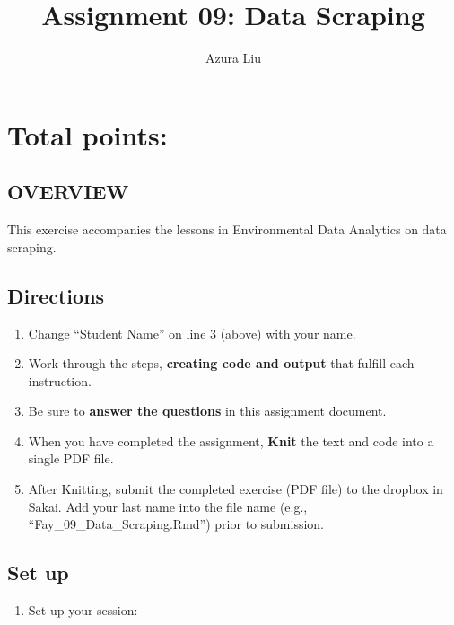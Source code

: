 \documentclass[
]{article}
\title{Assignment 09: Data Scraping}
\author{Azura Liu}
\date{}
\providecommand{\tightlist}{%
  \setlength{\itemsep}{0pt}\setlength{\parskip}{0pt}}
\begin{document}
\maketitle

\hypertarget{total-points}{%
\section{Total points:}\label{total-points}}

\hypertarget{overview}{%
\subsection{OVERVIEW}\label{overview}}

This exercise accompanies the lessons in Environmental Data Analytics on
data scraping.

\hypertarget{directions}{%
\subsection{Directions}\label{directions}}

\begin{enumerate}
\def\labelenumi{\arabic{enumi}.}
\tightlist
\item
  Change ``Student Name'' on line 3 (above) with your name.
\item
  Work through the steps, \textbf{creating code and output} that fulfill
  each instruction.
\item
  Be sure to \textbf{answer the questions} in this assignment document.
\item
  When you have completed the assignment, \textbf{Knit} the text and
  code into a single PDF file.
\item
  After Knitting, submit the completed exercise (PDF file) to the
  dropbox in Sakai. Add your last name into the file name (e.g.,
  ``Fay\_09\_Data\_Scraping.Rmd'') prior to submission.
\end{enumerate}

\hypertarget{set-up}{%
\subsection{Set up}\label{set-up}}

\begin{enumerate}
\def\labelenumi{\arabic{enumi}.}
\tightlist
\item
  Set up your session:
\end{enumerate}
\end{document}
